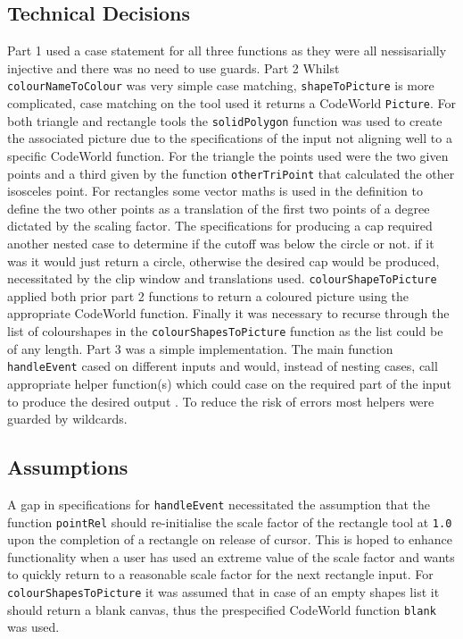 \documentclass[11pt]{article}
\begin{document}
\subsection{Technical Decisions}
Part 1 used a case statement for all three functions as they were all nessisarially injective and there was no need to use guards.
 Part 2 Whilst \verb|colourNameToColour| was  very simple case matching, \verb|shapeToPicture| is more complicated, case matching on the tool used it returns a CodeWorld \verb|Picture|. For both triangle and rectangle tools the \verb|solidPolygon| function was used to create the associated picture due to the specifications of the input not aligning well to a specific CodeWorld function. For the triangle the points used were the two given points and a third given by the function \verb|otherTriPoint| that calculated the other isosceles point. For rectangles some vector maths is used in the definition to define the two other points as a translation of the first two points of a degree dictated by the scaling factor. The specifications for producing a cap required another nested case to determine if the cutoff was below the circle or not. if it was it would just return a circle, otherwise the desired cap would be produced, necessitated by the clip window and translations used. \verb|colourShapeToPicture| applied both prior part 2 functions to return a coloured picture using the appropriate CodeWorld function. Finally it was necessary to recurse through the list of colourshapes in the \verb|colourShapesToPicture| function as the list could be of any length.
 Part 3 was a simple implementation. The main function \verb|handleEvent| cased on different inputs and would, instead of nesting cases, call appropriate helper function(s) which could case on the required part of the input to produce the desired output .  To reduce the risk of errors most helpers were guarded by wildcards.

\subsection{Assumptions}%
A gap in specifications for \verb|handleEvent| necessitated the assumption that the function \verb|pointRel| should re-initialise the scale factor of the rectangle tool at \verb|1.0| upon the completion of a rectangle on release of cursor. This is hoped to enhance functionality when a user has used an extreme value of the scale factor and wants to quickly return to a reasonable scale factor for the next rectangle input. For \verb|colourShapesToPicture| it was assumed that in case of an empty shapes list it should return a blank canvas, thus the prespecified CodeWorld function \verb|blank| was used.
\end{document}
